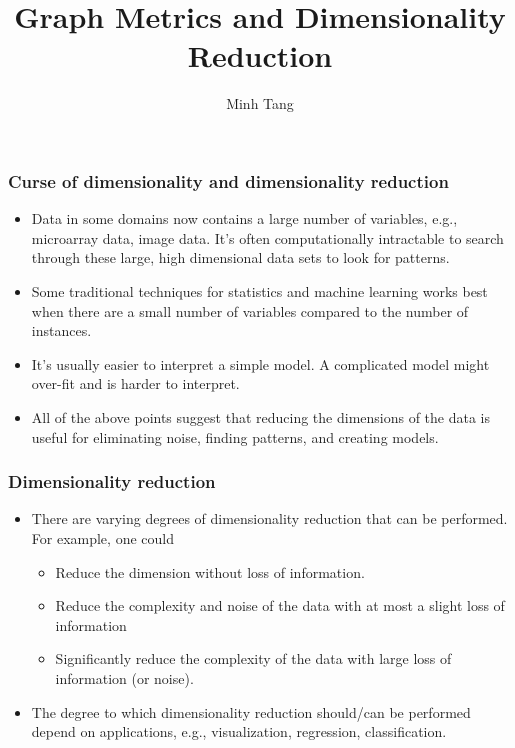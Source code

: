 \documentclass[professionalfonts,hyperref={colorlinks=true,linkcolor=red}]{beamer}
\title[Graph Metrics and Dimensionality Reduction]{Graph Metrics and
  Dimensionality Reduction}
\author[Minh Tang]{ Minh Tang}
\institute[Indiana University]{
  Department of Computer Science \\
  Indiana University, Bloomington
}
\begin{document}
\begin{frame}
  \titlepage
\end{frame}



\begin{frame}
  \frametitle{Curse of dimensionality and dimensionality reduction}
  \begin{itemize}[<+->]
  \item Data in some domains now contains a large number of variables,
    e.g., microarray data, image data. It's often computationally
    intractable to search through these large, high dimensional data sets to
    look for patterns.
  \item Some traditional techniques for statistics and machine
    learning works best when there are a small number of variables
    compared to the number of instances. 
  \item It's usually easier to interpret a simple model. A complicated
    model might over-fit and is harder to interpret.
  \item All of the above points suggest that reducing the
    dimensions of the data is useful for eliminating noise, finding
    patterns, and creating models. 
  \end{itemize}
\end{frame}

\begin{frame}
  \frametitle{Dimensionality reduction}
  \begin{itemize}[<+->]
  \item There are varying degrees of dimensionality reduction that can
    be performed. For example, one could 
    \begin{itemize}
    \item Reduce the dimension without loss of information. 
    \item Reduce the complexity and noise of the data with at most a
      slight loss of information
    \item Significantly reduce the complexity of the data with large
      loss of information (or noise). 
    \end{itemize}
  \item The degree to which dimensionality reduction should/can be
    performed depend on applications, e.g., visualization, regression,
    classification.  
  \end{itemize}
\end{frame}
\end{document}
